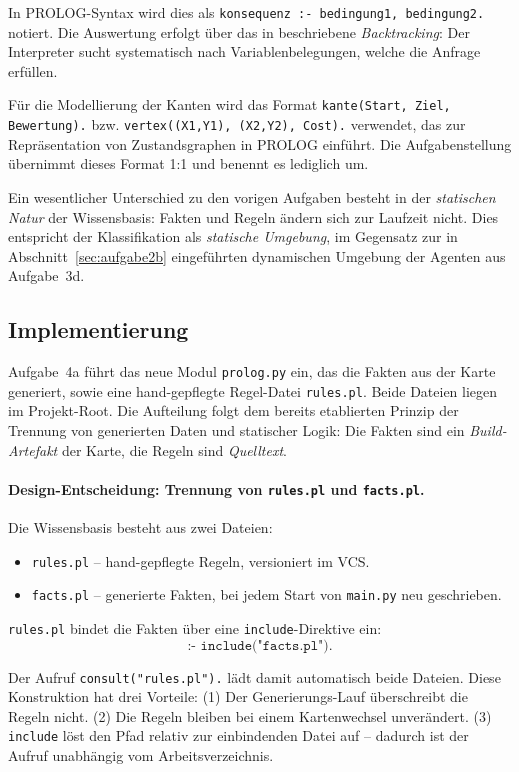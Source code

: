 In \acs{PROLOG}-Syntax wird dies als \texttt{konsequenz :- bedingung1, bedingung2.} notiert. Die Auswertung erfolgt über das in \textcite[S. 43\,ff.]{4} beschriebene \textit{Backtracking}: Der Interpreter sucht systematisch nach Variablenbelegungen, welche die Anfrage erfüllen.

Für die Modellierung der Kanten wird das Format \texttt{kante(Start, Ziel, Bewertung).} bzw. \texttt{vertex((X1,Y1), (X2,Y2), Cost).} verwendet, das \textcite[S. 69\,f.]{4} zur Repräsentation von Zustandsgraphen in \acs{PROLOG} einführt. Die Aufgabenstellung übernimmt dieses Format 1:1 und benennt es lediglich um.

Ein wesentlicher Unterschied zu den vorigen Aufgaben besteht in der \textit{statischen Natur} der Wissensbasis: Fakten und Regeln ändern sich zur Laufzeit nicht. Dies entspricht der Klassifikation als \textit{statische Umgebung}, im Gegensatz zur in Abschnitt~\ref{sec:aufgabe2b} eingeführten dynamischen Umgebung der Agenten aus Aufgabe~3d.

\subsection{Implementierung}

Aufgabe~4a führt das neue Modul \texttt{prolog.py} ein, das die Fakten aus der Karte generiert, sowie eine hand-gepflegte Regel-Datei \texttt{rules.pl}. Beide Dateien liegen im Projekt-Root. Die Aufteilung folgt dem bereits etablierten Prinzip der Trennung von generierten Daten und statischer Logik: Die Fakten sind ein \textit{Build-Artefakt} der Karte, die Regeln sind \textit{Quelltext}.

\paragraph{Design-Entscheidung: Trennung von \texttt{rules.pl} und \texttt{facts.pl}.}
Die Wissensbasis besteht aus zwei Dateien:
\begin{itemize}
    \item \texttt{rules.pl} -- hand-gepflegte Regeln, versioniert im \acs{VCS}.
    \item \texttt{facts.pl} -- generierte Fakten, bei jedem Start von \texttt{main.py} neu geschrieben.
\end{itemize}

\texttt{rules.pl} bindet die Fakten über eine \texttt{include}-Direktive ein:
\[
\texttt{:- include("facts.pl").}
\]

Der Aufruf \texttt{consult("rules.pl").} lädt damit automatisch beide Dateien. Diese Konstruktion hat drei Vorteile: (1) Der Generierungs-Lauf überschreibt die Regeln nicht. (2) Die Regeln bleiben bei einem Kartenwechsel unverändert. (3) \texttt{include} löst den Pfad relativ zur einbindenden Datei auf -- dadurch ist der Aufruf unabhängig vom Arbeitsverzeichnis.

